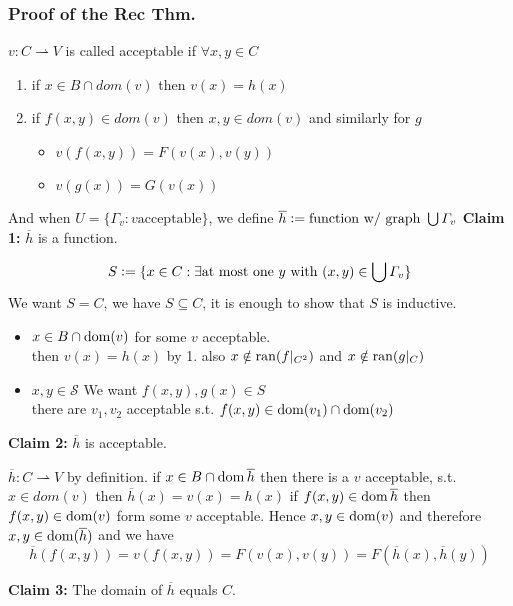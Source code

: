 \subsubsection*{Proof of the Rec Thm.}
$v:C\rightharpoonup  V$ is called acceptable if $\forall x,y\in C$ 
\begin{enumerate}
    \item if $x\in B\cap dom(v)$ then $v(x)=h(x)$
    \item if $f(x,y)\in dom(v)$ then $x,y\in dom(v)$ and similarly for $g$
    \begin{itemize}
        \item $v(f(x,y)) = F(v(x),v(y))$
        \item $v(g(x)) = G(v(x))$
    \end{itemize}
\end{enumerate}
And when $U = \{\varGamma_v : v \text{acceptable} \}$, we define
$\overline{h}\vcentcolon= \text{function w/ graph } \bigcup \varGamma_v$
\newpage
\textbf{Claim 1:} $\overline{h}$ is a function.
\begin{claimproof}
    $$S\vcentcolon= \{x\in C : \exists \text{at most one $y$ with } (x,y)\in \bigcup \varGamma_v\}$$
    We want $S = C$, we have $S\subseteq C$,
    it is enough to show that $S$ is inductive.
    \begin{itemize}
        \item $x\in B\cap \operatorname{dom}(v)$ for some $v$ acceptable.\\
        then $v(x) = h(x)$ by 1.
        also $x\notin \operatorname{ran} (f|_{C^2})$ and $x\notin \operatorname{ran} (g|_C)$
        \item $x,y \in \mathcal{S}$
        We want $f(x,y),g(x)\in S$\\
        there are $v_1,v_2$ acceptable s.t. $f(x,y)\in \operatorname{dom}(v_1)\cap \operatorname{dom}(v_2)$
    \end{itemize}
\end{claimproof}
\textbf{Claim 2:} $\overline{h}$ is acceptable.
\begin{claimproof}
    $\overline{h}: C \rightharpoonup V$ by definition.
    if $x\in B\cap \operatorname{dom} \overline{h}$ then there is a $v$ acceptable, s.t. $x\in dom(v)$
    then $\overline{h}(x) = v(x)=h(x)$
    if $f(x,y)\in \operatorname{dom} \overline{h}$ then $f(x,y)\in \operatorname{dom} (v)$ form some $v$ acceptable.
    Hence $x,y\in \operatorname{dom}(v)$ and therefore $x,y\in\operatorname{dom} (\overline{h})$
    and we have 
    $$\overline{h}(f(x,y)) = v(f(x,y)) = F(v(x),v(y)) = F(\overline{h}(x),\overline{h}(y))$$
\end{claimproof}
\textbf{Claim 3:} The domain of $\overline{h}$ equals $C$. 
